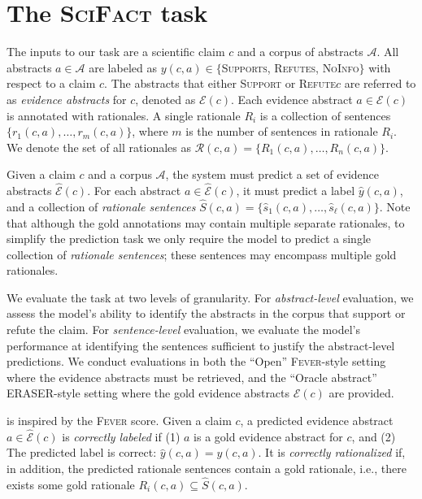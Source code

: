 \documentclass[11pt,a4paper]{article}
\newcommand{\ours}{\textsc{SciFact}\xspace}
\newcommand{\fever}{\textsc{Fever}\xspace}
\newcommand{\eraser}{\textsc{ERASER}\xspace}
\newcommand{\supports}{\textsc{Supports}\xspace}
\newcommand{\refutes}{\textsc{Refutes}\xspace}
\newcommand{\notenough}{\textsc{NoInfo}\xspace}
\newcommand{\support}{\textsc{Support}\xspace}
\newcommand{\refute}{\textsc{Refute}\xspace}
\newcommand{\yhat}{\widehat{y}}
\newcommand{\Shat}{\widehat{S}}
\newcommand{\shat}{\widehat{s}}
\newcommand{\Ehat}{\widehat{\cE}}
\newcommand{\cA}{{\mathcal{A}}}
\newcommand{\cE}{{\mathcal{E}}}
\newcommand{\cR}{{\mathcal{R}}}
\begin{document}
 \section{The \ours task} \label{sec:task_definition}
\vspace{.2cm}  The inputs to our task are a scientific claim $c$ and a corpus of abstracts $\cA$.
All abstracts $a \in \cA$ are labeled as $y(c, a)\in\{$\supports, \refutes, \notenough$\}$ with respect to a claim $c$.  The abstracts that either \support or \refute $c$ are referred to as \emph{evidence abstracts} for $c$, denoted as $\cE(c)$. Each evidence abstract $a \in \cE(c)$ is annotated with rationales. A single rationale $R_i$ is a collection of sentences $\{r_1(c, a), \dots, r_{m}(c, a)\}$, where $m$ is the number of sentences in rationale $R_i$.
We denote the set of all rationales as $\cR(c, a) = \{R_1(c, a), \dots, R_n(c, a)\}$.

Given a claim $c$ and a corpus $\cA$, the system must predict a set of evidence abstracts $\Ehat(c)$. For each abstract $a \in \Ehat(c)$, it must predict a label $\yhat(c, a)$, and a collection of \emph{rationale sentences} $\Shat(c, a) = \{\shat_1(c, a), \dots, \shat_{\ell}(c, a)\}$. Note that although the gold annotations may contain multiple separate rationales, to simplify the prediction task we only require the model to predict a single collection of \emph{rationale sentences}; these sentences may encompass multiple gold rationales.


\vspace{.2cm}  \label{sec:evaluation}
We evaluate the task at two levels of granularity. For \emph{abstract-level} evaluation, we assess the model's ability to identify the abstracts in the corpus that support or refute the claim. For \emph{sentence-level} evaluation, we evaluate the model's performance at identifying the sentences sufficient to justify the abstract-level predictions. We conduct evaluations in both the ``Open'' \fever-style \cite{Thorne2018FEVERAL} setting where the evidence abstracts must be retrieved, and the ``Oracle abstract'' \eraser-style \cite{DeYoung2019ERASERAB} setting where the gold evidence abstracts $\cE(c)$ are provided.


\vspace{.2cm}  is inspired by the \fever score. Given a claim $c$, a predicted evidence abstract $a \in \Ehat(c)$ is \emph{correctly labeled} if (1) $a$ is a gold evidence abstract for $c$, and (2) The predicted label is correct: $\yhat(c, a) = y(c, a)$. It is \emph{correctly rationalized} if, in addition, the predicted rationale sentences contain a gold rationale, i.e., there exists some gold rationale $R_i(c, a) \subseteq \Shat(c, a)$.
\end{document}
